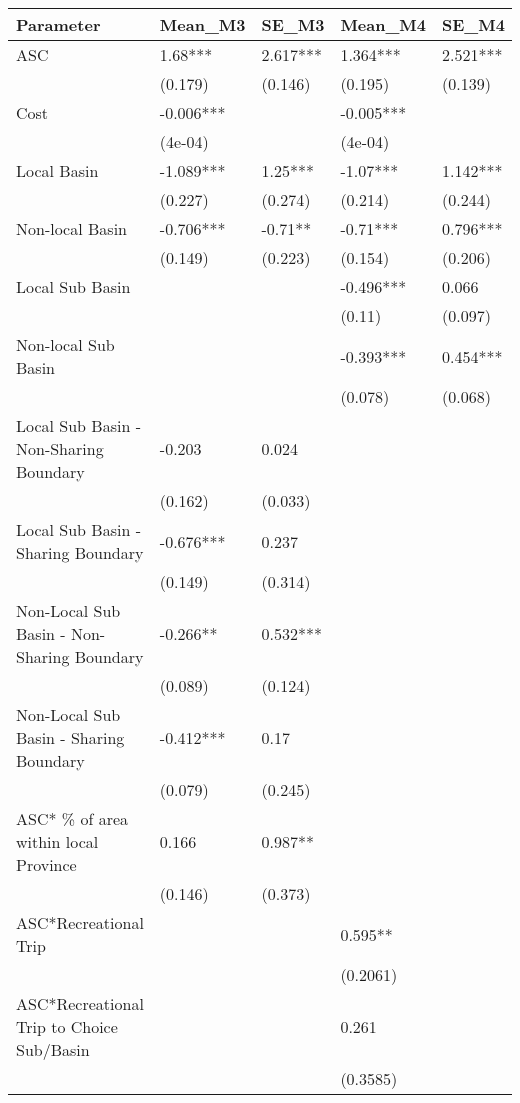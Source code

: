 \begin{table}[ht]
\centering
\begin{tabular}{lllll}
  \hline
Parameter & Mean\_M3 & SE\_M3 & Mean\_M4 & SE\_M4 \\ 
  \hline
ASC & 1.68*** & 2.617*** & 1.364*** & 2.521*** \\ 
   & (0.179) & (0.146) & (0.195) & (0.139) \\ 
  Cost & -0.006*** &  & -0.005*** &  \\ 
   & (4e-04) &  & (4e-04) &  \\ 
  Local Basin & -1.089*** & 1.25*** & -1.07*** & 1.142*** \\ 
   & (0.227) & (0.274) & (0.214) & (0.244) \\ 
  Non-local Basin & -0.706*** & -0.71** & -0.71*** & 0.796*** \\ 
   & (0.149) & (0.223) & (0.154) & (0.206) \\ 
  Local Sub Basin &  &  & -0.496*** & 0.066 \\ 
   &  &  & (0.11) & (0.097) \\ 
  Non-local Sub Basin &  &  & -0.393*** & 0.454*** \\ 
   &  &  & (0.078) & (0.068) \\ 
  Local Sub Basin - Non-Sharing Boundary & -0.203 & 0.024 &  &  \\ 
   & (0.162) & (0.033) &  &  \\ 
  Local Sub Basin - Sharing Boundary & -0.676*** & 0.237 &  &  \\ 
   & (0.149) & (0.314) &  &  \\ 
  Non-Local Sub Basin - Non-Sharing Boundary & -0.266** & 0.532*** &  &  \\ 
   & (0.089) & (0.124) &  &  \\ 
  Non-Local Sub Basin - Sharing Boundary & -0.412*** & 0.17 &  &  \\ 
   & (0.079) & (0.245) &  &  \\ 
  ASC* \% of area within local Province & 0.166 & 0.987** &  &  \\ 
   & (0.146) & (0.373) &  &  \\ 
  ASC*Recreational Trip &  &  & 0.595** &  \\ 
   &  &  & (0.2061) &  \\ 
  ASC*Recreational Trip to Choice Sub/Basin &  &  & 0.261 &  \\ 
   &  &  & (0.3585) &  \\ 
   \hline
\end{tabular}
\end{table}
